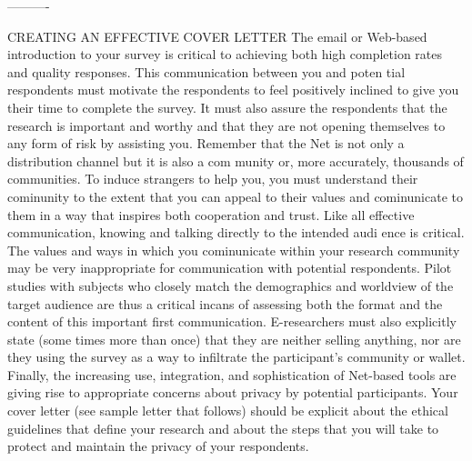 \documentclass{beamer}
\begin{document}
----------
\begin{frame}{CREATING AN EFFECTIVE COVER LETTER}
The email or Web-based introduction to your survey is critical to achieving both high completion 
rates and quality responses. This communication between you and poten tial respondents must motivate 
the respondents to feel positively inclined to give you their time to complete the survey. It must also 
assure the respondents that the research is important and worthy and that they are not opening themselves 
to any form of risk by assisting you. 
Remember that the Net is not only a distribution channel but it is also a com munity or, more accurately, 
thousands of communities. To induce strangers to help you, you must understand their cominunity to the extent 
that you can appeal to their values and cominunicate to them in a way that inspires both cooperation and trust. 
Like all effective communication, knowing and talking directly to the intended audi ence is critical. The values 
and ways in which you cominunicate within your research community may be very inappropriate for communication 
with potential respondents. Pilot studies with subjects who closely match the demographics and worldview of the 
target audience are thus a critical incans of assessing both the format and the content of this important first 
communication. E-researchers must also explicitly state (some times more than once) that they are neither selling 
anything, nor are they using the survey as a way to infiltrate the participant's community or wallet. 
Finally, the increasing use, integration, and sophistication of Net-based tools are giving rise to appropriate 
concerns about privacy by potential participants. Your cover letter (see sample letter that follows) should be 
explicit about the ethical guidelines that define your research and about the steps that you will take to protect 
and maintain the privacy of your respondents. 
\end{frame}
\end{document}
